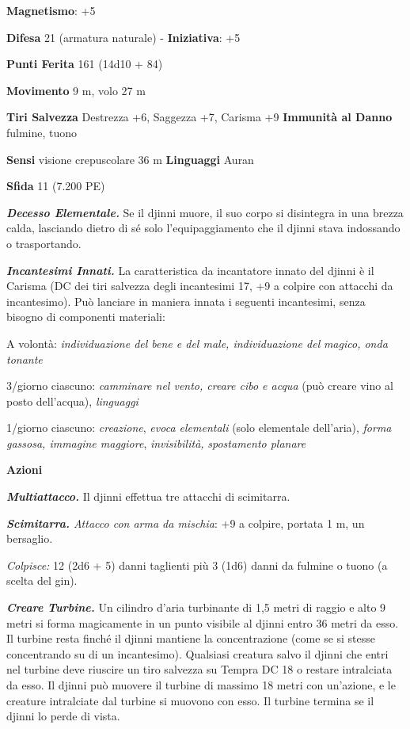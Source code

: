 \begin{multicols}{2}
\textbf{Magnetismo}: +5

\textbf{Difesa} 21 (armatura naturale) - \textbf{Iniziativa}: +5

\textbf{Punti Ferita} 161 (14d10 + 84)

\textbf{Movimento} 9 m, volo 27 m

\textbf{Tiri Salvezza} Destrezza +6, Saggezza +7, Carisma +9
\textbf{Immunità al Danno} fulmine, tuono

\textbf{Sensi} visione crepuscolare 36 m
\textbf{Linguaggi} Auran

\textbf{Sfida} 11 (7.200 PE)\smallskip

\emph{\textbf{Decesso Elementale.}} Se il djinni muore, il suo corpo si
disintegra in una brezza calda, lasciando dietro di sé solo
l'equipaggiamento che il djinni stava indossando o trasportando.

\emph{\textbf{Incantesimi Innati.}} La caratteristica da incantatore
innato del djinni è il Carisma (DC dei tiri salvezza degli incantesimi
17, +9 a colpire con attacchi da incantesimo). Può lanciare in maniera
innata i seguenti incantesimi, senza bisogno di componenti materiali:

A volontà: \emph{individuazione del bene e del male, individuazione del}
\emph{magico, onda tonante}

3/giorno ciascuno: \emph{camminare nel vento, creare cibo e acqua} (può
creare vino al posto dell'acqua), \emph{linguaggi}

1/giorno ciascuno: \emph{creazione}, \emph{evoca elementali} (solo
elementale dell'aria), \emph{forma gassosa, immagine maggiore},
\emph{invisibilità,} \emph{spostamento planare}

\smallskip\textbf{Azioni}

\emph{\textbf{Multiattacco.}} Il djinni effettua tre attacchi di
scimitarra.

\emph{\textbf{Scimitarra.} Attacco con arma da mischia}: +9 a colpire,
portata 1 m, un bersaglio.

\emph{Colpisce:} 12 (2d6 + 5) danni taglienti più 3 (1d6) danni da
fulmine o tuono (a scelta del gin).

\emph{\textbf{Creare Turbine.}} Un cilindro d'aria turbinante di 1,5
metri di raggio e alto 9 metri si forma magicamente in un punto visibile
al djinni entro 36 metri da esso. Il turbine resta finché il djinni
mantiene la concentrazione (come se si stesse concentrando su di un
incantesimo). Qualsiasi creatura salvo il djinni che entri nel turbine
deve riuscire un tiro salvezza su Tempra DC 18 o restare intralciata da
esso. Il djinni può muovere il turbine di massimo 18 metri con
un'azione, e le creature intralciate dal turbine si muovono con esso. Il
turbine termina se il djinni lo perde di vista.


\end{multicols}
